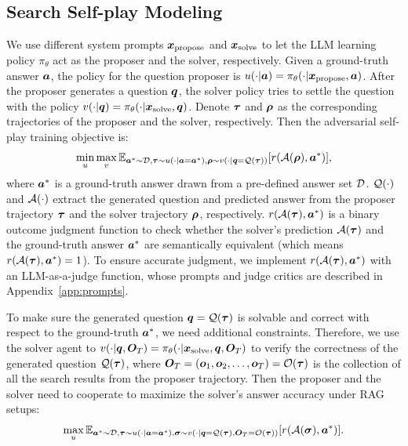 \documentclass[10pt, a4paper, logo]{googledeepmind} %
\begin{document}
\vspace{-1mm}
 \subsection{Search Self-play Modeling}\label{sec:ssp-modeling}
\vspace{-1mm}
 We use different system prompts ${\bm{x}}_\text{propose}$ and ${\bm{x}}_\text{solve}$ to let the LLM learning policy $\pi_\theta$ act as the proposer and the solver, respectively. Given a ground-truth answer ${\bm{a}}$,  the policy for the question proposer is $u(\cdot| {\bm{a}}) = \pi_\theta(\cdot| {\bm{x}}_\text{propose}, {\bm{a}})$.  After the proposer generates a question ${\bm{q}}$,  the solver policy tries to settle the question with the policy $v(\cdot|{\bm{q}}) = \pi_\theta(\cdot | {\bm{x}}_\text{solve}, {\bm{q}})$. Denote ${\bm{\tau}}$ and ${\bm{\rho}}$ as the corresponding trajectories of the proposer and the solver, respectively. Then the adversarial self-play training objective is: 
\begin{equation}\label{eq:adversarial-objective}
\min_{u } \max_{v} {\mathbb{E}}_{{\bm{a}}^* \sim {\mathcal{D}}, {\bm{\tau}} \sim u(\cdot| {\bm{a}} = {\bm{a}}^*), {\bm{\rho}} \sim v(\cdot| {\bm{q}} = {\mathcal{Q}}({\bm{\tau}}) ) }[r({\mathcal{A}}({\bm{\rho}}), {\bm{a}}^*)],
\end{equation}
where ${\bm{a}}^*$ is a ground-truth answer drawn from a pre-defined answer set ${\mathcal{D}}$. ${\mathcal{Q}}(\cdot)$ and ${\mathcal{A}}(\cdot)$ extract the generated question and predicted answer from the proposer trajectory ${\bm{\tau}}$ and the solver trajectory ${\bm{\rho}}$, respectively. $r({\mathcal{A}}({\bm{\tau}}),{\bm{a}}^*)$ is a binary outcome judgment function to check whether the solver's prediction ${\mathcal{A}}({\bm{\tau}})$ and the ground-truth answer ${\bm{a}}^*$ are semantically equivalent (which means $r({\mathcal{A}}({\bm{\tau}}), {\bm{a}}^*) = 1$). To ensure accurate judgment, we implement $r({\mathcal{A}}({\bm{\tau}}),{\bm{a}}^*)$ with an LLM-as-a-judge function, whose prompts and judge critics are described in Appendix~\ref{app:prompts}.

 To make sure the generated question ${\bm{q}} = {\mathcal{Q}}({\bm{\tau}})$ is solvable and correct with respect to the ground-truth ${\bm{a}}^*$, we need additional constraints. Therefore, we use the solver agent to $v(\cdot|{\bm{q}}, {\bm{O}}_{T}) = \pi_\theta(\cdot | {\bm{x}}_\text{solve}, {\bm{q}}, {\bm{O}}_T)$ to verify the correctness of the generated question ${\mathcal{Q}}({\bm{\tau}})$, where  ${\bm{O}}_T = ({\bm{o}}_1, {\bm{o}}_2, \dots, {\bm{o}}_T) = {\mathcal{O}}({\bm{\tau}})$ is the collection of all the search results from the proposer trajectory. Then the proposer and the solver need to cooperate to maximize the solver's answer accuracy under RAG setups:
\begin{equation}\label{eq:cooperative-objective}
    \max_{u} {\mathbb{E}}_{{\bm{a}}^* \sim {\mathcal{D}}, {\bm{\tau}} \sim u(\cdot|{\bm{a}}={\bm{a}}^*), {\bm{\sigma}} \sim v(\cdot|{\bm{q}}={\mathcal{Q}}({\bm{\tau}}), {\bm{O}}_T={\mathcal{O}}({\bm{\tau}}))} [r({\mathcal{A}}({\bm{\sigma}}), {\bm{a}}^*)]. 
\end{equation}
\end{document}
